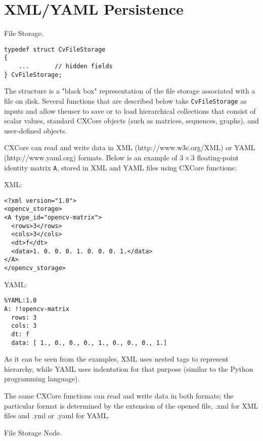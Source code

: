 \section{XML/YAML Persistence}

\ifCPy

\ifC
{}\label{CvFileStorage}
File Storage.

\begin{lstlisting}
typedef struct CvFileStorage
{
    ...       // hidden fields
} CvFileStorage;
\end{lstlisting}

The structure  is a "black box" representation
of the file storage associated with a file on disk. Several
functions that are described below take \texttt{CvFileStorage} as
inputs and allow theuser to save or to load hierarchical collections
that consist of scalar values, standard CXCore objects (such as
matrices, sequences, graphs), and user-defined objects.

CXCore can read and write data in XML (http://www.w3c.org/XML) or YAML
(http://www.yaml.org) formats. Below is an example of $3 \times 3$
floating-point identity matrix \texttt{A}, stored in XML and YAML files
using CXCore functions:

XML:

\begin{verbatim}
<?xml version="1.0">
<opencv_storage>
<A type_id="opencv-matrix">
  <rows>3</rows>
  <cols>3</cols>
  <dt>f</dt>
  <data>1. 0. 0. 0. 1. 0. 0. 0. 1.</data>
</A>
</opencv_storage>
\end{verbatim}

YAML:

\begin{verbatim}
%YAML:1.0
A: !!opencv-matrix
  rows: 3
  cols: 3
  dt: f
  data: [ 1., 0., 0., 0., 1., 0., 0., 0., 1.]
\end{verbatim}

As it can be seen from the examples, XML uses nested tags to represent
hierarchy, while YAML uses indentation for that purpose (similar
to the Python programming language).

The same CXCore functions can read and write data in both formats;
the particular format is determined by the extension of the opened
file, .xml for XML files and .yml or .yaml for YAML.


\label{CvFileNode}
File Storage Node.

